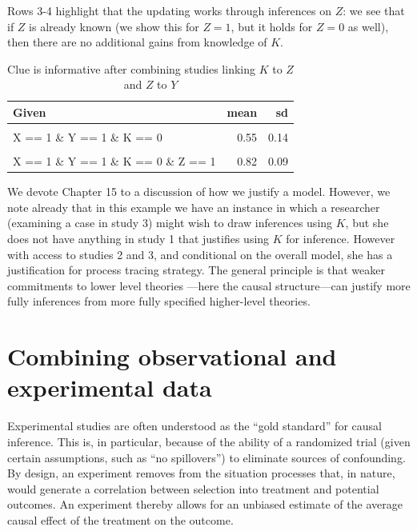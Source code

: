\documentclass[
  12pt,
]{book}
\begin{document}
Rows 3-4 highlight that the updating works through inferences on \(Z\): we see that if \(Z\) is already known (we show this for \(Z=1\), but it holds for \(Z=0\) as well), then there are no additional gains from knowledge of \(K\).

\begin{table}

\caption{\label{tab:frank4}Clue is informative after combining studies linking $K$ to $Z$ and $Z$ to $Y$}
\centering
\begin{tabular}[t]{lrr}
\toprule
Given & mean & sd\\
\midrule
\cellcolor{gray!6}{X == 1 \& Y == 1 \& K == 1} & \cellcolor{gray!6}{0.80} & \cellcolor{gray!6}{0.09}\\
X == 1 \& Y == 1 \& K == 0 & 0.55 & 0.14\\
\cellcolor{gray!6}{X == 1 \& Y == 1 \& K == 1 \& Z == 1} & \cellcolor{gray!6}{0.82} & \cellcolor{gray!6}{0.09}\\
X == 1 \& Y == 1 \& K == 0 \& Z == 1 & 0.82 & 0.09\\
\bottomrule
\end{tabular}
\end{table}

We devote Chapter 15 to a discussion of how we justify a model. However, we note already that in this example we have an instance in which a researcher (examining a case in study 3) might wish to draw inferences using \(K\), but she does not have anything in study 1 that justifies using \(K\) for inference. However with access to studies 2 and 3, and conditional on the overall model, she has a justification for process tracing strategy. The general principle is that weaker commitments to lower level theories ---here the causal structure---can justify more fully inferences from more fully specified higher-level theories.

\hypertarget{combining-observational-and-experimental-data}{%
\section{Combining observational and experimental data}\label{combining-observational-and-experimental-data}}

Experimental studies are often understood as the ``gold standard'' for causal inference. This is, in particular, because of the ability of a randomized trial (given certain assumptions, such as ``no spillovers'') to eliminate sources of confounding. By design, an experiment removes from the situation processes that, in nature, would generate a correlation between selection into treatment and potential outcomes. An experiment thereby allows for an unbiased estimate of the average causal effect of the treatment on the outcome.
\end{document}
